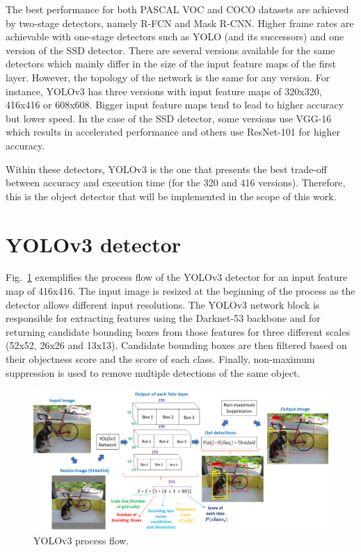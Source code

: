 The best performance for both PASCAL VOC and COCO datasets are achieved by two-stage detectors, namely R-FCN and Mask R-CNN. Higher frame rates are achievable with one-stage detectors such as YOLO (and its successors) and one version of the SSD detector. There are several versions available for the same detectors which mainly differ in the size of the input feature maps of the first layer. However, the topology of the network is the same for any version. For instance, YOLOv3 has three versions with input feature maps of  320x320, 416x416 or 608x608. Bigger input feature maps tend to lead to higher accuracy but lower speed. In the case of the SSD detector, some versions use VGG-16 which results in accelerated performance and others use ResNet-101 for higher accuracy. 

Within these detectors, YOLOv3 is the one that presents the best trade-off between accuracy and execution time (for the 320 and 416 versions). Therefore, this is the object detector that will be implemented in the scope of this work. 

\section{YOLOv3 detector}
\label{section:yolo}

Fig.~\ref{fig:yolov3} exemplifies the process flow of the YOLOv3 detector for an input feature map of 416x416. The input image is resized at the beginning of the process as the detector allows different input resolutions. The YOLOv3 network block is responsible for extracting features using the Darknet-53 backbone and for returning candidate bounding boxes from those features for three different scales (52x52, 26x26 and 13x13). Candidate bounding boxes are then filtered based on their objectness score and the score of each class. Finally, non-maximum suppression is used to remove multiple detections of the same object.  

\begin{figure}[!htb]
  \centering
  \includegraphics[width=\textwidth]{Figures/yolov3.png}
  \caption{YOLOv3 process flow.}
  \label{fig:yolov3}
\end{figure}

